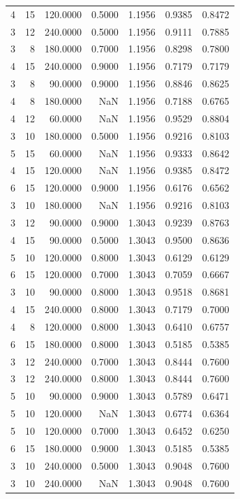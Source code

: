 \begin{tabular}{rrrrrrr}
4 & 15 & 120.0000 & 0.5000 & 1.1956 & 0.9385 & 0.8472 \\
3 & 12 & 240.0000 & 0.5000 & 1.1956 & 0.9111 & 0.7885 \\
3 & 8 & 180.0000 & 0.7000 & 1.1956 & 0.8298 & 0.7800 \\
4 & 15 & 240.0000 & 0.9000 & 1.1956 & 0.7179 & 0.7179 \\
3 & 8 & 90.0000 & 0.9000 & 1.1956 & 0.8846 & 0.8625 \\
4 & 8 & 180.0000 & NaN & 1.1956 & 0.7188 & 0.6765 \\
4 & 12 & 60.0000 & NaN & 1.1956 & 0.9529 & 0.8804 \\
3 & 10 & 180.0000 & 0.5000 & 1.1956 & 0.9216 & 0.8103 \\
5 & 15 & 60.0000 & NaN & 1.1956 & 0.9333 & 0.8642 \\
4 & 15 & 120.0000 & NaN & 1.1956 & 0.9385 & 0.8472 \\
6 & 15 & 120.0000 & 0.9000 & 1.1956 & 0.6176 & 0.6562 \\
3 & 10 & 180.0000 & NaN & 1.1956 & 0.9216 & 0.8103 \\
3 & 12 & 90.0000 & 0.9000 & 1.3043 & 0.9239 & 0.8763 \\
4 & 15 & 90.0000 & 0.5000 & 1.3043 & 0.9500 & 0.8636 \\
5 & 10 & 120.0000 & 0.8000 & 1.3043 & 0.6129 & 0.6129 \\
6 & 15 & 120.0000 & 0.7000 & 1.3043 & 0.7059 & 0.6667 \\
3 & 10 & 90.0000 & 0.8000 & 1.3043 & 0.9518 & 0.8681 \\
4 & 15 & 240.0000 & 0.8000 & 1.3043 & 0.7179 & 0.7000 \\
4 & 8 & 120.0000 & 0.8000 & 1.3043 & 0.6410 & 0.6757 \\
6 & 15 & 180.0000 & 0.8000 & 1.3043 & 0.5185 & 0.5385 \\
3 & 12 & 240.0000 & 0.7000 & 1.3043 & 0.8444 & 0.7600 \\
3 & 12 & 240.0000 & 0.8000 & 1.3043 & 0.8444 & 0.7600 \\
5 & 10 & 90.0000 & 0.9000 & 1.3043 & 0.5789 & 0.6471 \\
5 & 10 & 120.0000 & NaN & 1.3043 & 0.6774 & 0.6364 \\
5 & 10 & 120.0000 & 0.7000 & 1.3043 & 0.6452 & 0.6250 \\
6 & 15 & 180.0000 & 0.9000 & 1.3043 & 0.5185 & 0.5385 \\
3 & 10 & 240.0000 & 0.5000 & 1.3043 & 0.9048 & 0.7600 \\
3 & 10 & 240.0000 & NaN & 1.3043 & 0.9048 & 0.7600 \\

\end{tabular}
